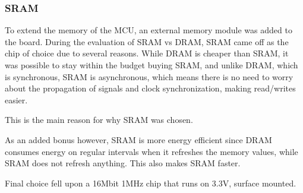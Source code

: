 
\subsubsection{SRAM}

To extend the memory of the MCU, an external memory module was added to the
board. During the evaluation of SRAM vs DRAM, SRAM came off as the chip of
choice due to several reasons. While DRAM is cheaper than SRAM, it was possible
to stay within the budget buying SRAM,
and unlike DRAM, which is synchronous, SRAM is asynchronous, which means there
is no need to worry about the propagation of signals and clock synchronization,
making read/writes easier.

This is the main reason for why SRAM was chosen.

As an added bonus however, SRAM is more energy efficient since DRAM consumes
energy on regular intervals when it refreshes the memory values, while SRAM does
not refresh anything. This also makes SRAM faster.

Final choice fell upon a 16Mbit 1MHz chip that runs on 3.3V, surface mounted.

